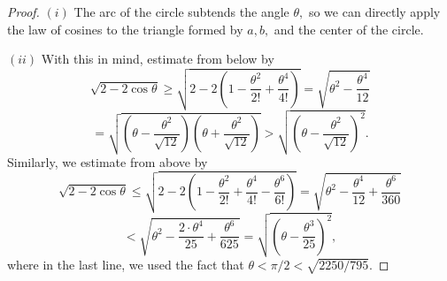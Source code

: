 \documentclass[10pt,a4paper]{amsart}
\begin{document}
\begin{proof}
$(i)$ The arc of the circle subtends the angle $\theta,$ so we can directly apply the law of cosines to the triangle formed by $a, b,$ and the center of the circle.

$(ii)$
With this in mind, estimate from below by
$$
\sqrt{2-2\cos \theta} \geq \sqrt{2-2\left(1-\frac{\theta^2}{2!}+\frac{\theta^4}{4!}\right)}=\sqrt{\theta^2-\frac{\theta^4}{12}}
$$
$$
=\sqrt{\left(\theta-\frac{\theta^2}{\sqrt{12}}\right)\left(\theta+\frac{\theta^2}{\sqrt{12}}\right)}> \sqrt{\left(\theta-\frac{\theta^2}{\sqrt{12}}\right)^2}.
$$
Similarly, we estimate from above by
$$
\sqrt{2-2\cos \theta} \leq \sqrt{2-2\left(1-\frac{\theta^2}{2!}+\frac{\theta^4}{4!}-\frac{\theta^6}{6!}\right)}
=\sqrt{\theta^2-\frac{\theta^4}{12}+\frac{\theta^6}{360}}
$$
$$
< \sqrt{\theta^2-\frac{2\cdot\theta^4}{25}+\frac{\theta^6}{625}} = \sqrt{\left(\theta - \frac{\theta^3}{25}\right)^2},
$$
where in the last line, we used the fact that $\theta<\pi/2< \sqrt{2250/795}.$
\end{proof}
\end{document}
